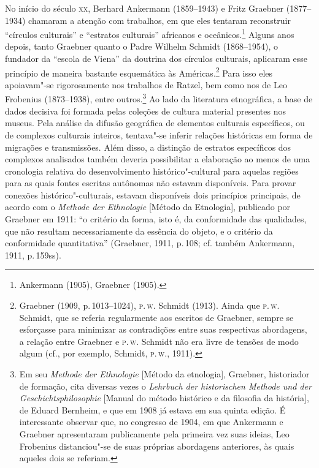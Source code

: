 No início do século \textsc{xx}, Berhard Ankermann (1859--1943) e Fritz Graebner
(1877--1934) chamaram a atenção com trabalhos, em que eles tentaram
reconstruir ``círculos culturais'' e ``estratos culturais'' africanos e
oceânicos.\footnote{Ankermann (1905), Graebner (1905).} Alguns anos
depois, tanto Graebner quanto o Padre Wilhelm Schmidt (1868--1954), o
fundador da ``escola de Viena'' da doutrina dos círculos culturais,
aplicaram esse princípio de maneira bastante esquemática às
Américas.\footnote{Graebner (1909, p.\,1013--1024), \textsc{p}.\,\textsc{w}. Schmidt (1913).
  Ainda que \textsc{p}.\,\textsc{w}. Schmidt, que se referia regularmente aos escritos de
  Graebner, sempre se esforçasse para minimizar as contradições entre
  suas respectivas abordagens, a relação entre Graebner e \textsc{p}.\,\textsc{w}. Schmidt
  não era livre de tensões de modo algum (cf., por exemplo, Schmidt,
  \textsc{p}.\,\textsc{w}., 1911).} Para isso eles apoiavam"-se rigorosamente nos trabalhos
de Ratzel, bem como nos de Leo Frobenius (1873--1938), entre
outros.\footnote{Em seu \textit{Methode der Ethnologie} {[}Método da
  etnologia{]}, Graebner, historiador de formação, cita diversas vezes
  o \textit{Lehrbuch der historischen Methode und der
  Geschichtsphilosophie} {[}Manual do método histórico e da filosofia da
  história{]}, de Eduard Bernheim, e que em 1908 já estava em sua quinta
  edição. É interessante observar que, no congresso de 1904, em que
  Ankermann e Graebner apresentaram publicamente pela primeira vez suas
  ideias, Leo Frobenius distanciou"-se de suas próprias abordagens
  anteriores, às quais aqueles dois se referiam.} Ao lado da literatura
etnográfica, a base de dados decisiva foi formada pelas coleções de
cultura material presentes nos museus. Pela análise da difusão
geográfica de elementos culturais específicos, ou de complexos
culturais inteiros, tentava"-se inferir relações históricas em forma de
migrações e transmissões. Além disso, a distinção de estratos
específicos dos complexos analisados também deveria possibilitar a
elaboração ao menos de uma cronologia relativa do desenvolvimento
histórico"-cultural para aquelas regiões para as quais fontes escritas
autônomas não estavam disponíveis. Para provar conexões
histórico"-culturais, estavam disponíveis dois princípios principais, de
acordo com o \textit{Methode der Ethnologie} {[}Método da Etnologia{]},
publicado por Graebner em 1911: ``o critério da forma, isto é, da
conformidade das qualidades, que não resultam necessariamente da
essência do objeto, e o critério da conformidade quantitativa''
(Graebner, 1911, p.\,108; cf. também Ankermann, 1911, p.\,159ss).


